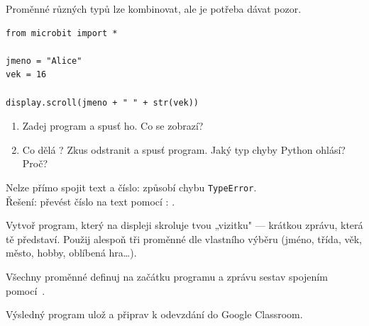 \begin{ukol}

Proměnné různých typů lze kombinovat, ale je potřeba dávat pozor.

\begin{lstlisting}
from microbit import *

jmeno = "Alice"
vek = 16

display.scroll(jmeno + " " + str(vek))
\end{lstlisting}


\begin{enumerate}
  \item Zadej program a spusť ho. Co se zobrazí?
  \item Co dělá ? Zkus  odstranit a spusť program.
        Jaký typ chyby Python ohlásí? Proč?
\end{enumerate}

\odpoved[3cm]

\begin{tcolorbox}[colback=yellow!12, colframe=orange!70!black,
                  fonttitle=\small\bfseries, title=Chyba: TypeError]
  \small
  Nelze přímo spojit text a číslo:  způsobí chybu \texttt{TypeError}.\\
  Řešení: převést číslo na text pomocí : .
\end{tcolorbox}

\end{ukol}

\begin{ukol}

Vytvoř program, který na displeji skroluje tvou „vizitku" — krátkou zprávu,
která tě představí. Použij alespoň tři proměnné dle vlastního výběru
(jméno, třída, věk, město, hobby, oblíbená hra\ldots).

Všechny proměnné definuj na začátku programu a zprávu sestav spojením pomocí~\pyinline{+}.

\odpoved[5cm]

\noindent Výsledný program ulož a připrav k odevzdání do Google Classroom.

\end{ukol}

